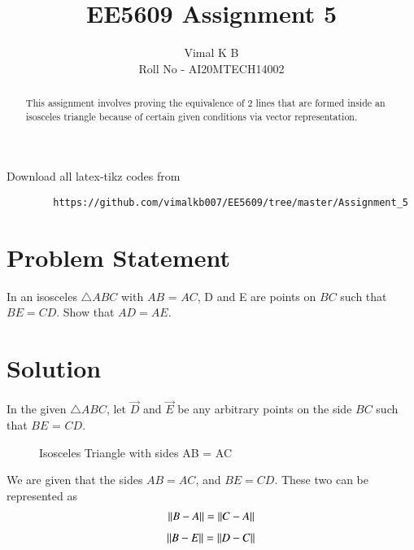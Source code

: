 \documentclass[journal,12pt,twocolumn]{IEEEtran}
\begin{document}
	
	
	\title{EE5609 Assignment 5}
	\author{Vimal K B \\Roll No - AI20MTECH14002}
	
	\maketitle
	\newpage
	\bigskip
	
	\renewcommand{\thefigure}{\theenumi}
	\renewcommand{\thetable}{\theenumi}
	
	\begin{abstract}
		This assignment involves proving the equivalence of 2 lines that are formed inside an isosceles triangle because of certain given conditions via vector representation.
	\end{abstract}

	Download all latex-tikz codes from 
	
	\begin{lstlisting}
		https://github.com/vimalkb007/EE5609/tree/master/Assignment_5
	\end{lstlisting}
	
	\section{Problem Statement}
In an isosceles $\triangle ABC$ with $AB$ = $AC$, D and E are points on $BC$ such that $BE = CD$. Show that $AD = AE$. 
	\section{Solution}
	
	In the given  $\triangle ABC$, let $\vec{D}$ and $\vec{E}$ be any arbitrary points on the side $BC$ such that $BE$ = $CD$.
	
	\renewcommand{\thefigure}{1}
	\begin{figure}[!ht] \label{fig:two_triangles}
		\centering
		\resizebox{\columnwidth}{!}{}
		\caption{Isosceles Triangle with sides AB = AC}
	\end{figure}
	We are given that the sides $AB = AC$, and $BE = CD$. These two can be represented as
	\begin{align}\label{eq:fact1}
		\left\lVert B-A\right\rVert = \left\lVert C-A\right\rVert
	\end{align}
	\begin{align}\label{eq:fact2}
		\left\lVert B-E\right\rVert = \left\lVert D-C\right\rVert
	\end{align}
	
\end{document}
